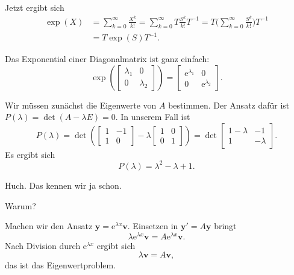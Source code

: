 \documentclass{beamer}
\newcommand{\ee}{\mathrm e}
\begin{document}
\begin{frame}
Jetzt ergibt sich
\[\begin{split}\exp(X) &= \sum_{k=0}^\infty \frac{X^k}{k!}
= \sum_{k=0}^\infty T\frac{S^k}{k!}T^{-1}
= T\Bigg(\sum_{k=0}^\infty \frac{S^k}{k!}\Bigg)T^{-1}\\
&= T\exp(S)T^{-1}.
\end{split}\]
\end{frame}

\begin{frame}
Das Exponential einer Diagonalmatrix ist ganz einfach:
\[\exp(\begin{bmatrix}
\lambda_1 & 0\\
0 & \lambda_2
\end{bmatrix})
= \begin{bmatrix}
\ee^{\lambda_1} & 0\\
0 & \ee^{\lambda_2}
\end{bmatrix}.\]
\end{frame}

\begin{frame}
Wir müssen zunächst die Eigenwerte von $A$ bestimmen.
Der Ansatz dafür ist $P(\lambda)=\det(A-\lambda E)=0$. In unserem
Fall ist
\[P(\lambda) = \det(
\begin{bmatrix}
1 & -1\\
1 & 0
\end{bmatrix}-\lambda\begin{bmatrix}
1 & 0\\
0 & 1
\end{bmatrix})
= \det\begin{bmatrix}
1-\lambda & -1\\
1 & -\lambda
\end{bmatrix}.\]
Es ergibt sich
\[P(\lambda) = \lambda^2-\lambda+1.\]
\end{frame}

\begin{frame}
Huch. Das kennen wir ja schon.
\end{frame}

\begin{frame}
Warum?
\end{frame}

\begin{frame}
Machen wir den Ansatz $\mathbf y = \ee^{\lambda x}\mathbf v$.
Einsetzen in $\mathbf y'=A\mathbf y$ bringt
\[\lambda\ee^{\lambda x}\mathbf v = A\ee^{\lambda x}\mathbf v.\]
Nach Division durch $\ee^{\lambda x}$ ergibt sich
\[\lambda\mathbf v = A\mathbf v,\]
das ist das Eigenwertproblem.
\end{frame}
\end{document}
